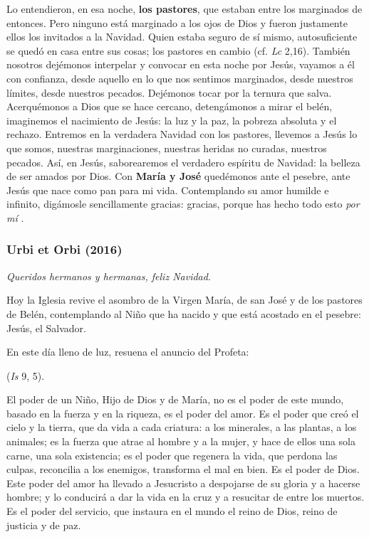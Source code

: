 Lo entendieron, en esa noche, \textbf{los pastores}, que estaban entre los marginados de entonces. Pero ninguno está marginado a los ojos de Dios y fueron justamente ellos los invitados a la Navidad. Quien estaba seguro de sí mismo, autosuficiente se quedó en casa entre sus cosas; los pastores en cambio  (cf. \emph{Lc} 2,16). También nosotros dejémonos interpelar y convocar en esta noche por Jesús, vayamos a él con confianza, desde aquello en lo que nos sentimos marginados, desde nuestros límites, desde nuestros pecados. Dejémonos tocar por la ternura que salva. Acerquémonos a Dios que se hace cercano, detengámonos a mirar el belén, imaginemos el nacimiento de Jesús: la luz y la paz, la pobreza absoluta y el rechazo. Entremos en la verdadera Navidad con los pastores, llevemos a Jesús lo que somos, nuestras marginaciones, nuestras heridas no curadas, nuestros pecados. Así, en Jesús, saborearemos el verdadero espíritu de Navidad: la belleza de ser amados por Dios. Con \textbf{María y José} quedémonos ante el pesebre, ante Jesús que nace como pan para mi vida. Contemplando su amor humilde e infinito, digámosle sencillamente gracias: gracias, porque has hecho todo esto \emph{por mí} .




\subsubsection{Urbi et Orbi (2016)}

\emph{Queridos hermanos y hermanas, feliz Navidad}.

Hoy la Iglesia revive el asombro de la Virgen María, de san José y de los pastores de Belén, contemplando al Niño que ha nacido y que está acostado en el pesebre: Jesús, el Salvador.

En este día lleno de luz, resuena el anuncio del Profeta:

 (\emph{Is} 9, 5).

El poder de un Niño, Hijo de Dios y de María, no es el poder de este mundo, basado en la fuerza y en la riqueza, es el poder del amor. Es el poder que creó el cielo y la tierra, que da vida a cada criatura: a los minerales, a las plantas, a los animales; es la fuerza que atrae al hombre y a la mujer, y hace de ellos una sola carne, una sola existencia; es el poder que regenera la vida, que perdona las culpas, reconcilia a los enemigos, transforma el mal en bien. Es el poder de Dios. Este poder del amor ha llevado a Jesucristo a despojarse de su gloria y a hacerse hombre; y lo conducirá a dar la vida en la cruz y a resucitar de entre los muertos. Es el poder del servicio, que instaura en el mundo el reino de Dios, reino de justicia y de paz.

